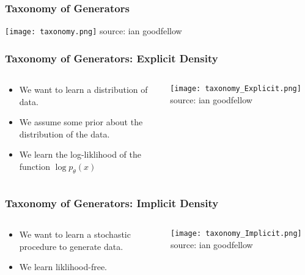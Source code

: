 \begin{frame}
    \frametitle{Taxonomy of Generators}
    \texttt{[image: taxonomy.png]}
    \null\hfill \tiny{source: ian goodfellow}
\end{frame}

\begin{frame}
    \frametitle{Taxonomy of Generators: Explicit Density}
    \begin{columns}
        \begin{column}{0.48\paperwidth}
            \begin{itemize}
                \item We want to learn a distribution of
                    data. 
                \item We assume some prior about the distribution of the data. 
                \item We learn the log-liklihood of the function $\log
                    p_\theta(x)$
            \end{itemize}
        \end{column}
        \begin{column}{0.48\paperwidth}
            \texttt{[image: taxonomy\_Explicit.png]}
            \null\hfill \tiny{source: ian goodfellow}
        \end{column}
    \end{columns}
\end{frame}

\begin{frame}
    \frametitle{Taxonomy of Generators: Implicit Density}
    \begin{columns}
        \begin{column}{0.48\paperwidth}
            \begin{itemize}
                \item We want to learn a stochastic procedure to generate data. 
                \item We learn liklihood-free.
            \end{itemize}
        \end{column}
        \begin{column}{0.48\paperwidth}
            \texttt{[image: taxonomy\_Implicit.png]}
            \null\hfill \tiny{source: ian goodfellow}
        \end{column}
    \end{columns}
\end{frame}

